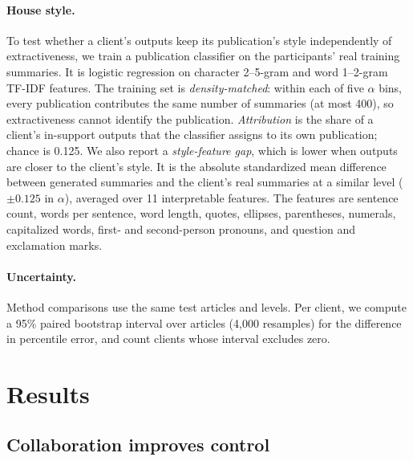 \documentclass[11pt]{article}
\begin{document}
\paragraph{House style.}
To test whether a client's outputs keep its publication's style independently of extractiveness, we train a publication classifier on the participants' real training summaries.
It is logistic regression on character 2--5-gram and word 1--2-gram TF-IDF features.
The training set is \emph{density-matched}: within each of five $\alpha$ bins, every publication contributes the same number of summaries (at most 400), so extractiveness cannot identify the publication.
\emph{Attribution} is the share of a client's in-support outputs that the classifier assigns to its own publication; chance is 0.125.
We also report a \emph{style-feature gap}, which is lower when outputs are closer to the client's style.
It is the absolute standardized mean difference between generated summaries and the client's real summaries at a similar level ($\pm0.125$ in $\alpha$), averaged over 11 interpretable features.
The features are sentence count, words per sentence, word length, quotes, ellipses, parentheses, numerals, capitalized words, first- and second-person pronouns, and question and exclamation marks.

\paragraph{Uncertainty.}
Method comparisons use the same test articles and levels.
Per client, we compute a 95\% paired bootstrap interval over articles (4{,}000 resamples) for the difference in percentile error, and count clients whose interval excludes zero.

\section{Results}
\label{sec:results}

\subsection{Collaboration improves control}
\label{sec:results-c1}
\end{document}
